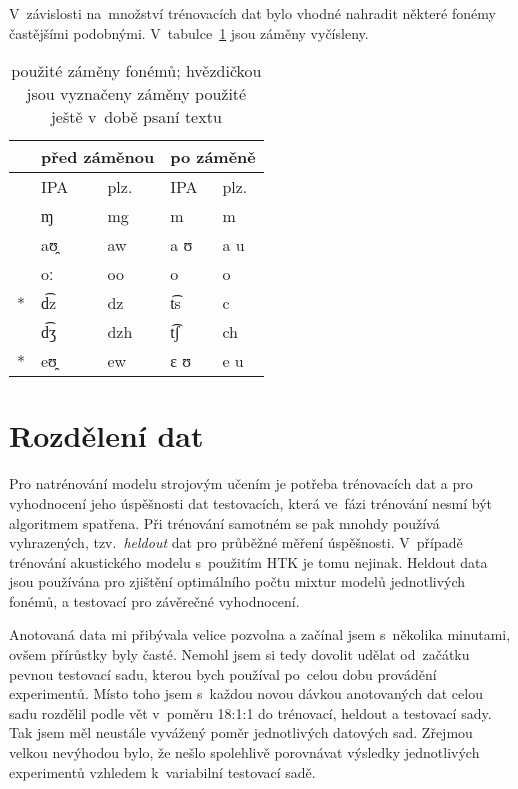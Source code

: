 V~závislosti na~množství trénovacích dat bylo vhodné nahradit některé fonémy
častějšími podobnými. V~tabulce~\ref{tab:phonesed} jsou záměny vyčísleny.
\begin{table}[htpb]
\begin{center}
\begin{tabular}{|r|l|l||l|l|}
\hline
&
\multicolumn{2}{|c||}{před záměnou} &
\multicolumn{2}{|c|}{po záměně} \\
\hline
& IPA & plz. & IPA & plz. \\
\hline
    & ɱ  & mg & m & m \\
    & aʊ̯ & aw & a ʊ & a u \\
    & oː & oo & o & o \\
\** & d͡z & dz & t͡s & c \\
    & d͡ʒ & dzh & t͡ʃ & ch \\
\** & eʊ̯ & ew & ɛ ʊ & e u \\
\hline
\end{tabular}
\caption{použité záměny fonémů; hvězdičkou jsou vyznačeny záměny použité ještě
v~době psaní textu}\label{tab:phonesed}
\end{center}
\end{table}
\normalfont

\section{Rozdělení dat}

Pro natrénování modelu strojovým učením je potřeba trénovacích dat a pro
vyhodnocení jeho úspěšnosti dat testovacích, která ve~fázi trénování nesmí být
algoritmem spatřena. Při trénování samotném se pak mnohdy používá vyhrazených,
tzv.~\textit{heldout} dat pro průběžné měření úspěšnosti. V~případě trénování
akustického modelu s~použitím HTK je tomu nejinak. Heldout data jsou používána
pro zjištění optimálního počtu mixtur modelů jednotlivých fonémů, a testovací
pro závěrečné vyhodnocení.

Anotovaná data mi přibývala velice pozvolna a začínal jsem s~několika minutami,
ovšem přírůstky byly časté. Nemohl jsem si tedy dovolit udělat od~začátku pevnou
testovací sadu, kterou bych používal po~celou dobu provádění experimentů. Místo
toho jsem s~každou novou dávkou anotovaných dat celou sadu rozdělil podle vět
v~poměru 18:1:1 do trénovací, heldout a testovací sady. Tak jsem měl neustále
vyvážený poměr jednotlivých datových sad. Zřejmou velkou nevýhodou bylo, že
nešlo spolehlivě porovnávat výsledky jednotlivých experimentů vzhledem
k~variabilní testovací sadě.


